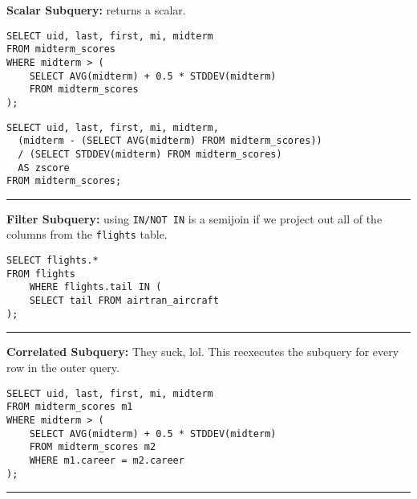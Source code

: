 \documentclass{report}
\renewcommand{\bf}[1]{\textbf{{#1}}}
\renewcommand{\tt}[1]{\texttt{{#1}}}
\begin{document}
\bf{Scalar Subquery:} returns a scalar.
\vspace{-1.5em}
\begin{multicols}{2}
\begin{verbatim}
SELECT uid, last, first, mi, midterm
FROM midterm_scores
WHERE midterm > (
    SELECT AVG(midterm) + 0.5 * STDDEV(midterm)
    FROM midterm_scores
);
\end{verbatim}
\columnbreak
\begin{verbatim}
SELECT uid, last, first, mi, midterm, 
  (midterm - (SELECT AVG(midterm) FROM midterm_scores))
  / (SELECT STDDEV(midterm) FROM midterm_scores) 
  AS zscore
FROM midterm_scores;
\end{verbatim}
\end{multicols}
\vspace{-0.5em}
\hrule
\vspace{0.2em}

\bf{Filter Subquery:} using \tt{IN/NOT IN} is a semijoin if we project out all of the columns from 
the \tt{flights} table.
\vspace{-1em}
\begin{verbatim}
SELECT flights.*
FROM flights
    WHERE flights.tail IN (
    SELECT tail FROM airtran_aircraft
);
\end{verbatim}
\vspace{-0.5em}
\hrule
\vspace{0.2em}

\bf{Correlated Subquery:} They suck, lol. This reexecutes the subquery for every row in the outer
query.
\vspace{-1em}
\begin{verbatim}
SELECT uid, last, first, mi, midterm
FROM midterm_scores m1
WHERE midterm > (
    SELECT AVG(midterm) + 0.5 * STDDEV(midterm)
    FROM midterm_scores m2
    WHERE m1.career = m2.career
);
\end{verbatim}
\vspace{-0.5em}
\hrule
\vspace{0.2em}
\end{document}
